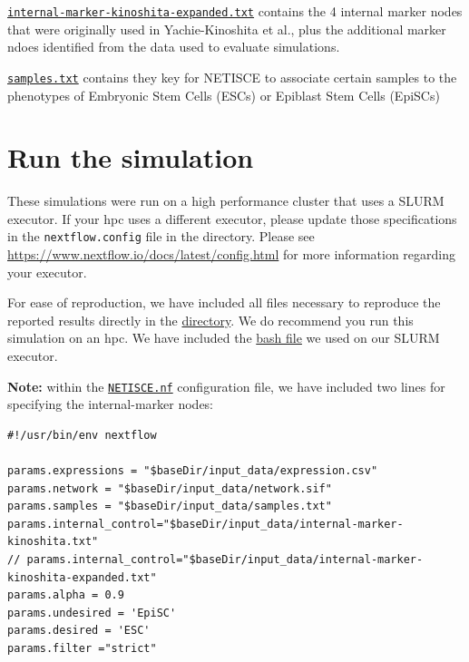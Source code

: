 \documentclass[
]{book}
\begin{document}
\href{https://github.com/VeraLiconaResearchGroup/Netisce/blob/main/ipsc_validation/input_data/internal-marker-kinoshita-expanded.txt}{\texttt{internal-marker-kinoshita-expanded.txt}} contains the 4 internal marker nodes that were originally used in Yachie-Kinoshita et al., plus the additional marker ndoes identified from the data used to evaluate simulations.

\href{https://github.com/VeraLiconaResearchGroup/Netisce/blob/main/ipsc_validation/input_data/samples.txt}{\texttt{samples.txt}} contains they key for NETISCE to associate certain samples to the phenotypes of Embryonic Stem Cells (ESCs) or Epiblast Stem Cells (EpiSCs)

\hypertarget{run-the-simulation-1}{%
\section{Run the simulation}\label{run-the-simulation-1}}

These simulations were run on a high performance cluster that uses a SLURM executor. If your hpc uses a different executor, please update those specifications in the \texttt{nextflow.config} file in the directory. Please see \url{https://www.nextflow.io/docs/latest/config.html} for more information regarding your executor.

For ease of reproduction, we have included all files necessary to reproduce the reported results directly in the \href{https://github.com/VeraLiconaResearchGroup/Netisce/tree/main/ipsc_validation}{directory}. We do recommend you run this simulation on an hpc. We have included the \href{https://github.com/VeraLiconaResearchGroup/Netisce/blob/main/ipsc_validation/run.sh}{bash file} we used on our SLURM executor.

\textbf{Note: } within the \href{https://github.com/VeraLiconaResearchGroup/Netisce/blob/main/ipsc_validation/NETISCE.nf}{\texttt{NETISCE.nf}} configuration file, we have included two lines for specifying the internal-marker nodes:

\begin{verbatim}
#!/usr/bin/env nextflow

params.expressions = "$baseDir/input_data/expression.csv"
params.network = "$baseDir/input_data/network.sif"
params.samples = "$baseDir/input_data/samples.txt"
params.internal_control="$baseDir/input_data/internal-marker-kinoshita.txt"
// params.internal_control="$baseDir/input_data/internal-marker-kinoshita-expanded.txt"
params.alpha = 0.9
params.undesired = 'EpiSC'
params.desired = 'ESC'
params.filter ="strict"
\end{verbatim}
\end{document}
